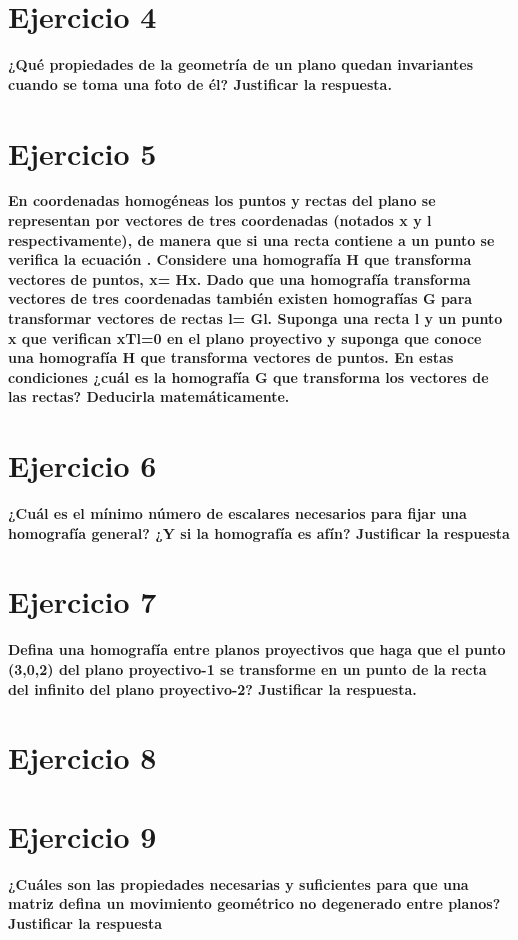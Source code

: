 \documentclass[11pt,a4paper]{article}
\begin{document}
\section*{Ejercicio 4}
\textbf{¿Qué propiedades de la geometría de un plano quedan invariantes cuando se toma una foto de él? Justificar la respuesta.}


\section*{Ejercicio 5}
\textbf{En coordenadas homogéneas los puntos y rectas del plano se representan por vectores de tres coordenadas (notados x y l respectivamente), de
manera que si una recta contiene a un punto se verifica la ecuación 
. Considere una homografía H que transforma vectores de puntos, x= Hx. Dado que una homografía transforma vectores de tres coordenadas también
existen homografías G para transformar vectores de rectas l= Gl. Suponga una recta l y un punto x que verifican xTl=0 en el plano proyectivo y
suponga que conoce una homografía H que transforma vectores de puntos. En estas condiciones ¿cuál es la homografía G que transforma los vectores de
las rectas? Deducirla matemáticamente.}

\section*{Ejercicio 6}
\textbf{¿Cuál es el mínimo número de escalares necesarios para fijar una homografía general? ¿Y si la homografía es afín? Justificar la respuesta}


\section*{Ejercicio 7}
\textbf{Defina una homografía entre planos proyectivos que haga que el punto (3,0,2) del plano proyectivo-1 se transforme en un punto de la recta del
infinito del plano proyectivo-2? Justificar la respuesta.}


\section*{Ejercicio 8}
\textbf{}

\section*{Ejercicio 9}
\textbf{¿Cuáles son las propiedades necesarias y suficientes para que una matriz defina un movimiento geométrico no degenerado entre planos? Justificar
la respuesta}
\end{document}

